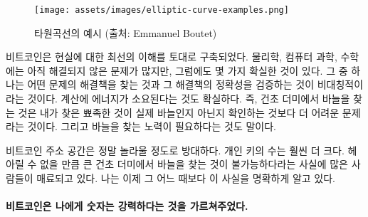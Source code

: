 \begin{figure}
	\texttt{[image: assets/images/elliptic-curve-examples.png]}
	\caption{타원곡선의 예시 (출처: Emmanuel Boutet)}
	\label{fig:elliptic-curve-examples}
\end{figure}

\begin{comment}
	Bitcoin is built upon our best understanding of reality. While there are
	still many open problems in physics, computer science, and mathematics,
	we are pretty sure about some things. That there is an asymmetry between
	finding solutions and validating the correctness of these solutions is
	one such thing. That computation needs energy is another one. In other
	words: finding a needle in a haystack is harder than checking if the
	pointy thing in your hand is indeed a needle or not. And finding the
	needle takes work.
\end{comment}
비트코인은 현실에 대한 최선의 이해를 토대로 구축되었다.
물리학, 컴퓨터 과학, 수학에는 아직 해결되지 않은 문제가 많지만, 그럼에도 몇 가지 확실한 것이 있다.
그 중 하나는 어떤 문제의 해결책을 찾는 것과 그 해결책의 정확성을 검증하는 것이 비대칭적이라는 것이다.
계산에 에너지가 소요된다는 것도 확실하다.
즉, 건초 더미에서 바늘을 찾는 것은 내가 찾은 뾰족한 것이 실제 바늘인지 아닌지 확인하는 것보다 더 어려운 문제라는 것이다. 
그리고 바늘을 찾는 노력이 필요하다는 것도 말이다.

\begin{comment}
	The vastness of Bitcoin's address space is truly mind-boggling. The
	number of private keys even more so. It is fascinating how much of our
	modern world boils down to the improbability of finding a needle in an
	unfathomably large haystack. I am now more aware of this fact than ever.
\end{comment}
비트코인 주소 공간은 정말 놀라울 정도로 방대하다. 개인 키의 수는 훨씬 더 크다.
헤아릴 수 없을 만큼 큰 건초 더미에서 바늘을 찾는 것이 불가능하다라는 사실에 많은 사람들이 매료되고 있다.
나는 이제 그 어느 때보다 이 사실을 명확하게 알고 있다.

\paragraph{비트코인은 나에게 숫자는 강력하다는 것을 가르쳐주었다.}



